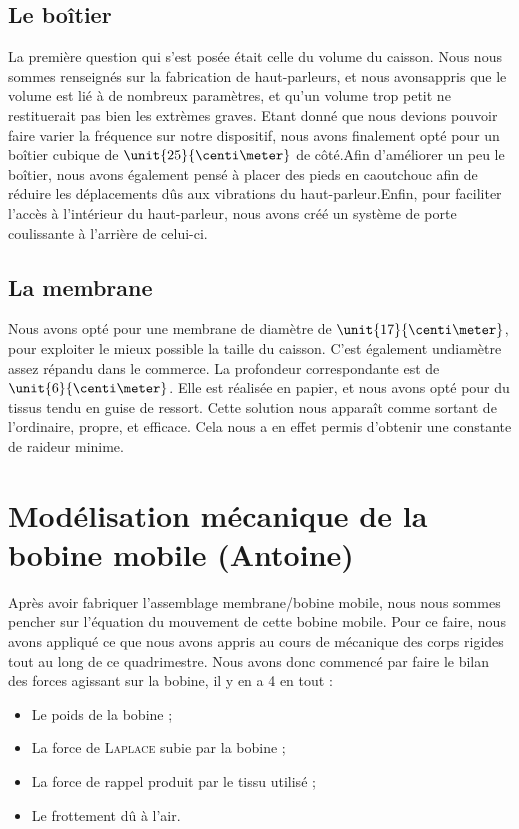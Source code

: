 \documentclass{article}
\begin{document}
\subsection{Le boîtier}
La première question qui s'est posée était celle du volume du caisson. Nous nous sommes renseignés sur la fabrication de 
haut-parleurs, et nous avonsappris que le volume est lié à de nombreux paramètres, et qu'un volume trop petit ne restituerait 
pas bien les extrèmes graves. Etant donné que nous devions pouvoir faire varier la fréquence sur notre dispositif, nous avons 
finalement opté pour un boîtier cubique de $\unit{25}{\centi\meter}$ de côté.Afin d'améliorer un peu le boîtier, nous avons
également pensé à placer des pieds en caoutchouc afin de réduire les déplacements dûs aux vibrations du haut-parleur.Enfin,
pour faciliter l'accès à l'intérieur du haut-parleur, nous avons créé un système de porte coulissante à l'arrière de celui-ci.

\subsection{La membrane}
Nous avons opté pour une membrane de diamètre de $\unit{17}{\centi\meter}$, pour exploiter le mieux possible la taille du
caisson. C'est également undiamètre assez répandu dans le commerce. La profondeur correspondante est de $\unit{6}{\centi\meter}$.
Elle est réalisée en papier, et nous avons opté pour du tissus tendu en guise de ressort. Cette solution nous apparaît comme
sortant de l'ordinaire, propre, et efficace. Cela nous a en effet permis d'obtenir une constante de raideur minime.

\section{Modélisation mécanique de la bobine mobile (Antoine)}
Après avoir fabriquer l'assemblage membrane/bobine mobile, nous nous sommes pencher
sur l'équation du mouvement de cette bobine mobile. Pour ce faire, nous avons appliqué
ce que nous avons appris au cours de mécanique des corps rigides tout au long de ce quadrimestre.
Nous avons donc commencé par faire le bilan des forces agissant sur la bobine, il y en a 4 en tout :

\begin{itemize}
	\item Le poids de la bobine ;
	\item La force de \textsc{Laplace} subie par la bobine ;
	\item La force de rappel produit par le tissu utilisé ;
	\item Le frottement dû à l'air.
\end{itemize}
\end{document}
